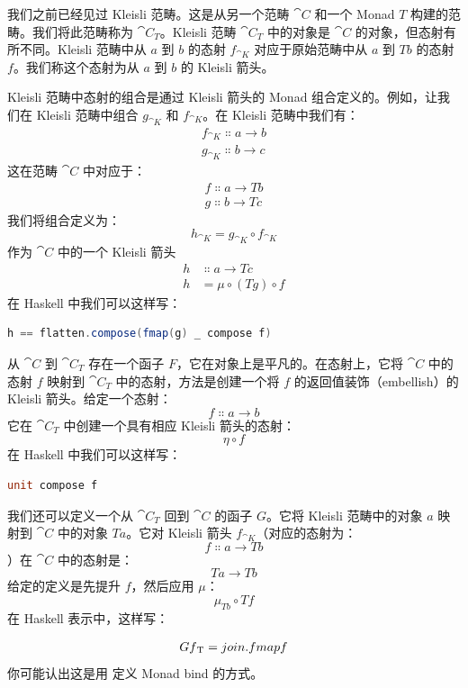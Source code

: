 我们之前已经见过 Kleisli 范畴。这是从另一个范畴 $\cat{C}$ 和一个 Monad $T$ 构建的范畴。我们将此范畴称为 $\cat{C}_T$。Kleisli 范畴 $\cat{C}_T$ 中的对象是 $\cat{C}$ 的对象，但态射有所不同。Kleisli 范畴中从 $a$ 到 $b$ 的态射 $f_{\cat{K}}$ 对应于原始范畴中从 $a$ 到 $T b$ 的态射 $f$。我们称这个态射为从 $a$ 到 $b$ 的 Kleisli 箭头。

Kleisli 范畴中态射的组合是通过 Kleisli 箭头的 Monad 组合定义的。例如，让我们在 Kleisli 范畴中组合 $g_{\cat{K}}$ 和 $f_{\cat{K}}$。在 Kleisli 范畴中我们有：
\begin{gather*}
  f_{\cat{K}} \Colon a \to b \\
  g_{\cat{K}} \Colon b \to c
\end{gather*}
这在范畴 $\cat{C}$ 中对应于：
\begin{gather*}
  f \Colon a \to T b \\
  g \Colon b \to T c
\end{gather*}
我们将组合定义为：
\[h_{\cat{K}} = g_{\cat{K}} \circ f_{\cat{K}}\]
作为 $\cat{C}$ 中的一个 Kleisli 箭头
\begin{align*}
  h & \Colon a \to T c          \\
  h & = \mu \circ (T g) \circ f
\end{align*}
在 Haskell 中我们可以这样写：

\begin{lstlisting}[language=Scala]
h == flatten.compose(fmap(g) _ compose f)
\end{lstlisting}
从 $\cat{C}$ 到 $\cat{C}_T$ 存在一个函子 $F$，它在对象上是平凡的。在态射上，它将 $\cat{C}$ 中的态射 $f$ 映射到 $\cat{C}_T$ 中的态射，方法是创建一个将 $f$ 的返回值装饰（embellish）的 Kleisli 箭头。给定一个态射：
\[f \Colon a \to b\]
它在 $\cat{C}_T$ 中创建一个具有相应 Kleisli 箭头的态射：
\[\eta \circ f\]
在 Haskell 中我们可以这样写：

\begin{lstlisting}[language=Scala]
unit compose f
\end{lstlisting}
我们还可以定义一个从 $\cat{C}_T$ 回到 $\cat{C}$ 的函子 $G$。它将 Kleisli 范畴中的对象 $a$ 映射到 $\cat{C}$ 中的对象 $T a$。它对 Kleisli 箭头 $f_{\cat{K}}$（对应的态射为：
\[f \Colon a \to T b\]
）在 $\cat{C}$ 中的态射是：
\[T a \to T b\]
给定的定义是先提升 $f$，然后应用 $\mu$：
\[\mu_{T b} \circ T f\]
在 Haskell 表示中，这样写：

\begin{align}
  G f\textsubscript{T} = join . fmap f
\end{align}
你可能认出这是用  定义 Monad bind 的方式。

